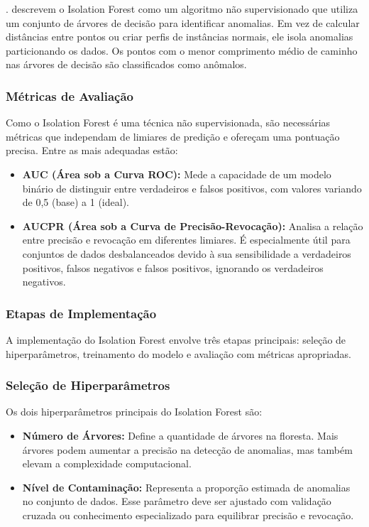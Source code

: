 \documentclass[12pt,a4paper]{article}
\begin{document}
\cite{gupta2020}. descrevem o Isolation Forest como um algoritmo não supervisionado que utiliza um conjunto de árvores de decisão para identificar anomalias. Em vez de calcular distâncias entre pontos ou criar perfis de instâncias normais, ele isola anomalias particionando os dados. Os pontos com o menor comprimento médio de caminho nas árvores de decisão são classificados como anômalos.

\subsubsection{Métricas de Avaliação}
Como o Isolation Forest é uma técnica não supervisionada, são necessárias métricas que independam de limiares de predição e ofereçam uma pontuação precisa. Entre as mais adequadas estão:
\begin{itemize}
    \item \textbf{AUC (Área sob a Curva ROC):} Mede a capacidade de um modelo binário de distinguir entre verdadeiros e falsos positivos, com valores variando de 0,5 (base) a 1 (ideal).
    \item \textbf{AUCPR (Área sob a Curva de Precisão-Revocação):} Analisa a relação entre precisão e revocação em diferentes limiares. É especialmente útil para conjuntos de dados desbalanceados devido à sua sensibilidade a verdadeiros positivos, falsos negativos e falsos positivos, ignorando os verdadeiros negativos.
\end{itemize}

\subsubsection{Etapas de Implementação}
A implementação do Isolation Forest envolve três etapas principais: seleção de hiperparâmetros, treinamento do modelo e avaliação com métricas apropriadas.

\subsubsection{Seleção de Hiperparâmetros}
Os dois hiperparâmetros principais do Isolation Forest são:
\begin{itemize}
    \item \textbf{Número de Árvores:} Define a quantidade de árvores na floresta. Mais árvores podem aumentar a precisão na detecção de anomalias, mas também elevam a complexidade computacional.
    \item \textbf{Nível de Contaminação:} Representa a proporção estimada de anomalias no conjunto de dados. Esse parâmetro deve ser ajustado com validação cruzada ou conhecimento especializado para equilibrar precisão e revocação.
\end{itemize}
\end{document}
